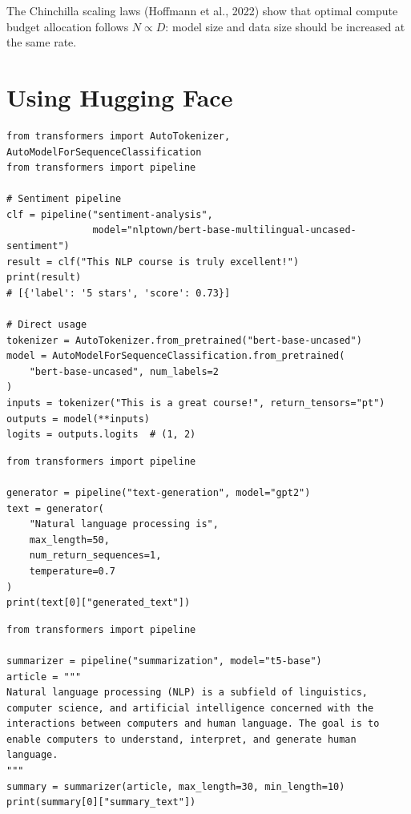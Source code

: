 \begin{remark}
The Chinchilla scaling laws (Hoffmann et al., 2022) show that optimal compute
budget allocation follows $N \propto D$: model size and data size should be
increased at the same rate.
\end{remark}

\section{Using Hugging Face}
\label{sec:pre:hf}

\begin{codeblock}[title=\textbf{BERT for text classification}]
\begin{verbatim}
from transformers import AutoTokenizer, AutoModelForSequenceClassification
from transformers import pipeline

# Sentiment pipeline
clf = pipeline("sentiment-analysis",
               model="nlptown/bert-base-multilingual-uncased-sentiment")
result = clf("This NLP course is truly excellent!")
print(result)
# [{'label': '5 stars', 'score': 0.73}]

# Direct usage
tokenizer = AutoTokenizer.from_pretrained("bert-base-uncased")
model = AutoModelForSequenceClassification.from_pretrained(
    "bert-base-uncased", num_labels=2
)
inputs = tokenizer("This is a great course!", return_tensors="pt")
outputs = model(**inputs)
logits = outputs.logits  # (1, 2)
\end{verbatim}
\end{codeblock}

\begin{codeblock}[title=\textbf{GPT-2 for text generation}]
\begin{verbatim}
from transformers import pipeline

generator = pipeline("text-generation", model="gpt2")
text = generator(
    "Natural language processing is",
    max_length=50,
    num_return_sequences=1,
    temperature=0.7
)
print(text[0]["generated_text"])
\end{verbatim}
\end{codeblock}

\begin{codeblock}[title=\textbf{T5 for summarization}]
\begin{verbatim}
from transformers import pipeline

summarizer = pipeline("summarization", model="t5-base")
article = """
Natural language processing (NLP) is a subfield of linguistics,
computer science, and artificial intelligence concerned with the
interactions between computers and human language. The goal is to
enable computers to understand, interpret, and generate human language.
"""
summary = summarizer(article, max_length=30, min_length=10)
print(summary[0]["summary_text"])
\end{verbatim}
\end{codeblock}

